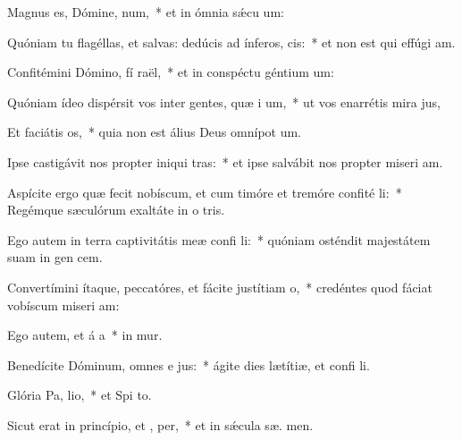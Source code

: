 \item Magnus es, Dómine,  num,~* et in ómnia sǽcu  um:
\item Quóniam tu flagéllas, et salvas: dedúcis ad ínferos,  cis:~* et non est qui effúgi  am.
\item Confitémini Dómino, fí raël,~* et in conspéctu géntium  um:
\item Quóniam ídeo dispérsit vos inter gentes, quæ i um,~* ut vos enarrétis mira jus,
\item Et faciátis  os,~* quia non est álius Deus omnípot  um.
\item Ipse castigávit nos propter iniqui tras:~* et ipse salvábit nos propter miseri am.
\item Aspícite ergo quæ fecit nobíscum, et cum timóre et tremóre confité li:~* Regémque sæculórum exaltáte in o tris.
\item Ego autem in terra captivitátis meæ confi li:~* quóniam osténdit majestátem suam in gen cem.
\item Convertímini ítaque, peccatóres, et fácite justítiam  o,~* credéntes quod fáciat vobíscum miseri am:
\item Ego autem, et á a~* in  mur.
\item Benedícite Dóminum, omnes e jus:~* ágite dies lætítiæ, et confi li.
\item Glória Pa,  lio,~* et Spi to.
\item Sicut erat in princípio, et ,  per,~* et in sǽcula sæ. men.
